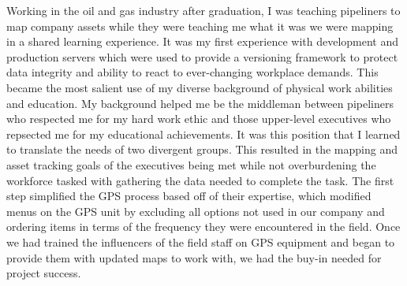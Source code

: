 \documentclass[12pt, letterpaper]{awesome-cv} %
\begin{document}
\begin{cvletter}
Working in the oil and gas industry after graduation, I was %
teaching pipeliners to map company assets while they were teaching me what it was we were mapping in a shared learning experience.%
It was my first experience with development and production servers which were used to provide a versioning framework to protect data integrity and ability to react to ever-changing workplace demands. %
This became the most salient use of my diverse background of physical work abilities and education. My background helped me be the middleman between pipeliners who respected me for my hard work ethic and those upper-level executives who repsected me for my educational achievements. It was this position that I learned to translate the needs of two divergent groups. This resulted in the mapping and asset tracking goals of the executives being met while not overburdening the workforce tasked with gathering the data needed to complete the task. %
The first step simplified the GPS process based off of their expertise, which modified menus on the GPS unit by excluding all options not used in our company and ordering items in terms of the frequency they were encountered in the field. Once we had trained the influencers of the field staff on GPS equipment and began to provide them with updated maps to work with, we had the buy-in needed for project success. %

\end{cvletter}
\end{document}
